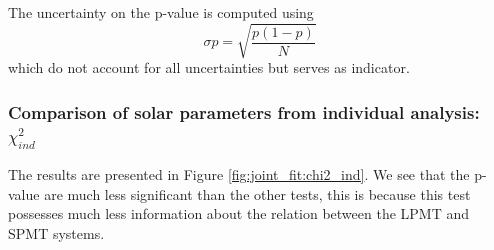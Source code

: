 \documentclass[../main.tex]{subfiles}
\begin{document}
The uncertainty on the p-value is computed using
\begin{equation}
  \sigma p = \sqrt{\frac{p(1-p)}{N}}
\end{equation}
which do not account for all uncertainties but serves as indicator.

\subsubsection{Comparison of solar parameters from individual analysis: $\chi^2_{ind}$}

The results are presented in Figure \ref{fig:joint_fit:chi2_ind}. We see that the p-value are much less significant than the other tests, this is because this test possesses much less information about the relation between the LPMT and SPMT systems.
\end{document}
